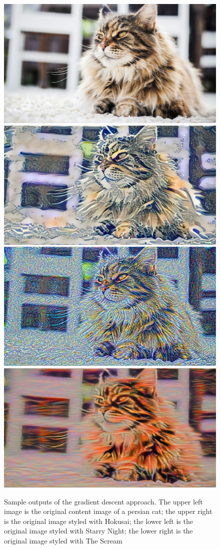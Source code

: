 \documentclass[10pt,twocolumn,letterpaper]{article}
\begin{document}
\begin{figure}[t]
\begin{center}
   \includegraphics[width=0.45\linewidth]{persian_cat.jpg} \includegraphics[width=0.45\linewidth]{persian_cat+hokusai.jpg}		\includegraphics[width=0.45\linewidth]{persian_cat+starry_night.jpg} \includegraphics[width=0.45\linewidth]{persian_cat+the_scream.jpg}
\end{center}
   \caption{Sample outputs of the gradient descent approach. The upper left image is the original content image of a persian cat; the upper right is the original image styled with Hokusai; the lower left is the original image styled with Starry Night; the lower right is the original image styled with The Scream}
\label{fig:long}
\label{fig:onecol}
\end{figure}
\end{document}
